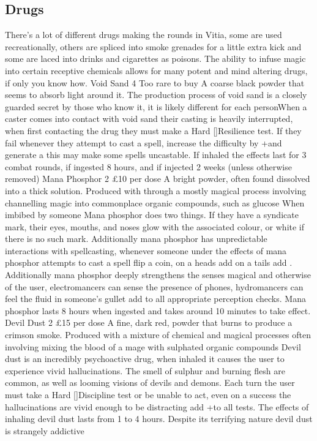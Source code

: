 \documentclass{article}
\newcommand\Hard{Hard [\Purple[3]]}
\begin{document}
\subsection{Drugs}
\begin{multicols}{2}
There's a lot of different drugs making the rounds in Vitia, some are used recreationally, others are spliced into smoke grenades for a little extra kick and some are laced into drinks and cigarettes as poisons. The ability to infuse magic into certain receptive chemicals allows for many potent and mind altering drugs, if only you know how. 
\Equipment
{Void Sand}
{4}
{Too rare to buy}
{A coarse black powder that seems to absorb light around it. The production process of void sand is a closely guarded secret by those who know it, it is likely different for each person}{When a caster comes into contact with void sand their casting is heavily interrupted, when first contacting the drug they must make a \Hard Resilience test. If they fail whenever they attempt to cast a spell, increase the difficulty by +\Purple[1] and generate a \Despair this may make some spells uncastable. If inhaled the effects last for 3 combat rounds, if ingested 8 hours, and if injected 2 weeks (unless otherwise removed)}
\Equipment
{Mana Phosphor}
{2}
{£10 per dose}
{A bright powder, often found dissolved into a thick solution. Produced with through a mostly magical process involving channelling magic into commonplace organic compounds, such as glucose}
{When imbibed by someone Mana phosphor does two things. If they have a syndicate mark, their eyes, mouths, and noses glow with the associated colour, or white if there is no such mark. Additionally mana phosphor has unpredictable interactions with spellcasting, whenever someone under the effects of mana phosphor attempts to cast a spell flip a coin, on a heads add \Triumph on a tails add \Despair. Additionally mana phosphor deeply strengthens the senses magical and otherwise of the user, electromancers can sense the presence of phones, hydromancers can feel the fluid in someone's gullet add \Blue[2] to all appropriate perception checks. Mana phosphor lasts 8 hours when ingested and takes around 10 minutes to take effect. }
\Equipment
{Devil Dust}
{2}
{£15 per dose}
{A fine, dark red, powder that burns to produce a crimson smoke. Produced with a mixture of chemical and magical processes often involving mixing the blood of a mage with sulphated organic compounds}
{Devil dust is an incredibly psychoactive drug, when inhaled it causes the user to experience vivid hallucinations. The smell of sulphur and burning flesh are common, as well as looming visions of devils and demons. Each turn the user must take a \Hard  Discipline test or be unable to act, even on a success the hallucinations are vivid enough to be distracting add +\Black[2] to all tests. The effects of inhaling devil dust lasts from 1 to 4 hours. Despite its terrifying nature devil dust is strangely addictive}

\end{multicols}
\end{document}
